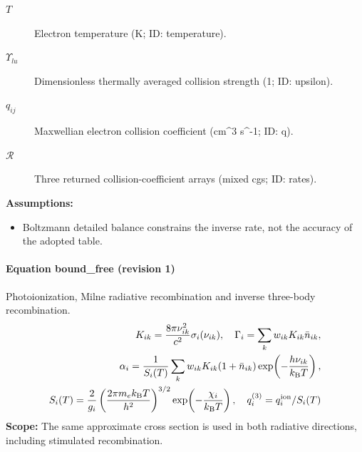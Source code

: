 \begin{description}
\item[$T$] Electron temperature (K; ID: temperature).
\item[$\Upsilon_{lu}$] Dimensionless thermally averaged collision strength (1; ID: upsilon).
\item[$q_{ij}$] Maxwellian electron collision coefficient (cm\textasciicircum{}3 s\textasciicircum{}-1; ID: q).
\item[$\mathcal R$] Three returned collision-coefficient arrays (mixed cgs; ID: rates).
\end{description}

\noindent\textbf{Assumptions:}
\begin{itemize}
\item Boltzmann detailed balance constrains the inverse rate, not the accuracy of the adopted table.
\end{itemize}

\paragraph{Equation bound\_free (revision 1)}
Photoionization, Milne radiative recombination and inverse three-body recombination.
\begin{equation}
\begin{aligned}
K_{ik}=\frac{8\pi\nu_{ik}^2}{c^2}\sigma_i(\nu_{ik}),\quad \Gamma_i=\sum_k w_{ik}K_{ik}\bar n_{ik},\\\alpha_i=\frac{1}{S_i(T)}\sum_k w_{ik}K_{ik}(1+\bar n_{ik})\exp\!\left(-\frac{h\nu_{ik}}{k_{\rm B}T}\right),\\S_i(T)=\frac{2}{g_i}\left(\frac{2\pi m_e k_{\rm B}T}{h^2}\right)^{3/2}\exp\!\left(-\frac{\chi_i}{k_{\rm B}T}\right),\quad q_i^{(3)}=q_i^{\rm ion}/S_i(T)
\end{aligned}
\label{eq:escape.hydrogen_5f_nlte:bound_5f_free:1}
\end{equation}
\noindent\textbf{Scope:} The same approximate cross section is used in both radiative directions, including stimulated recombination.


